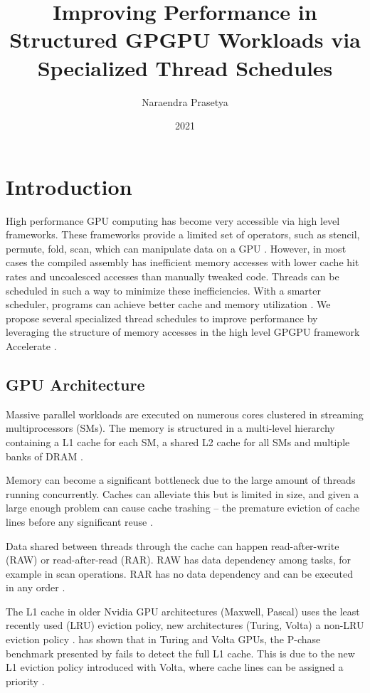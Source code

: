\documentclass{article}
\title{Improving Performance in Structured GPGPU Workloads via Specialized Thread Schedules}
\author{Naraendra Prasetya}
\date{2021}
\begin{document}
\maketitle

\section{Introduction}    
High performance GPU computing has become very accessible via high level frameworks.
These frameworks provide a limited set of operators, such as stencil, permute, fold, scan, which can manipulate data on a GPU \cite{chakravarty2011accelerating}.
However, in most cases the compiled assembly has inefficient memory accesses with lower cache hit rates and uncoalesced accesses than manually tweaked code.
Threads can be scheduled in such a way to minimize these inefficiencies.
With a smarter scheduler, programs can achieve better cache and memory utilization \cite{nugteren2014study}.
We propose several specialized thread schedules to improve performance by leveraging the structure of memory accesses in the high level GPGPU framework Accelerate \cite{chakravarty2011accelerating}.

\subsection{GPU Architecture}
Massive parallel workloads are executed on numerous cores clustered in streaming multiprocessors (SMs).
The memory is structured in a multi-level hierarchy containing a L1 cache for each SM, a shared L2 cache for all SMs and multiple banks of DRAM \cite{nvidia2017volta,nvidia2020ampere}.

Memory can become a significant bottleneck due to the large amount of threads running concurrently.
Caches can alleviate this but is limited in size, and given a large enough problem can cause cache trashing -- the premature eviction of cache lines before any significant reuse \cite{dai2016model}.

Data shared between threads through the cache can happen read-after-write (RAW) or read-after-read (RAR).
RAW has data dependency among tasks, for example in scan operations.
RAR has no data dependency and can be executed in any order \cite{tripathy2021paver}.

The L1 cache in older Nvidia GPU architectures (Maxwell, Pascal) uses the least recently used (LRU) eviction policy, new architectures (Turing, Volta) a non-LRU eviction policy \cite{jia2019dissecting, jia2018dissecting,mei2016dissecting}.
\citet{jia2019dissecting} has shown that in Turing and Volta GPUs, the P-chase benchmark presented by \citet{mei2016dissecting} fails to detect the full L1 cache.
This is due to the new L1 eviction policy introduced with Volta, where cache lines can be assigned a priority \cite{jia2019dissecting,nvidia2021cudadocs}.
\end{document}
